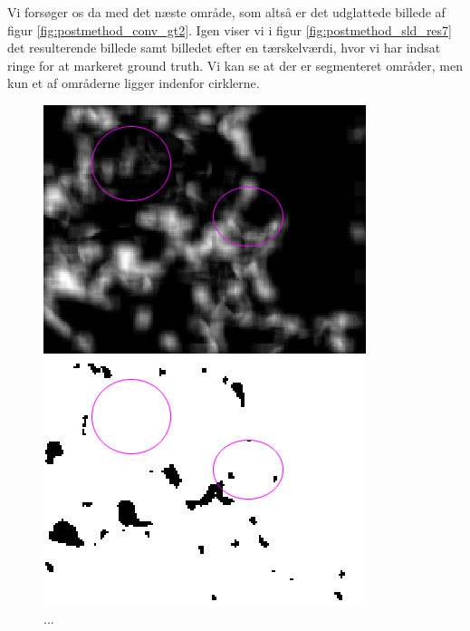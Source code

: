 Vi forsøger os da med det næste område, som altså er det udglattede billede af figur \ref{fig:postmethod_conv_gt2}. Igen viser vi i figur \ref{fig:postmethod_sld_res7} det resulterende billede samt billedet efter en tærskelværdi, hvor vi har indsat ringe for at markeret ground truth. Vi kan se at der er segmenteret områder, men kun et af områderne ligger indenfor cirklerne.

\begin{figure}[H]
	\begin{minipage}[b]{0.5\linewidth}
		\centering
		\includegraphics[scale=0.54]{files/postmethod/img/sld_res8.png}
	\end{minipage}
	\hspace{0.8cm}
	\begin{minipage}[b]{0.5\linewidth}
		\centering
		\includegraphics[scale=0.54]{files/postmethod/img/sld_res9.png}
	\end{minipage}
	\caption{...\label{fig:postmethod_sld_res6}}
\end{figure}

